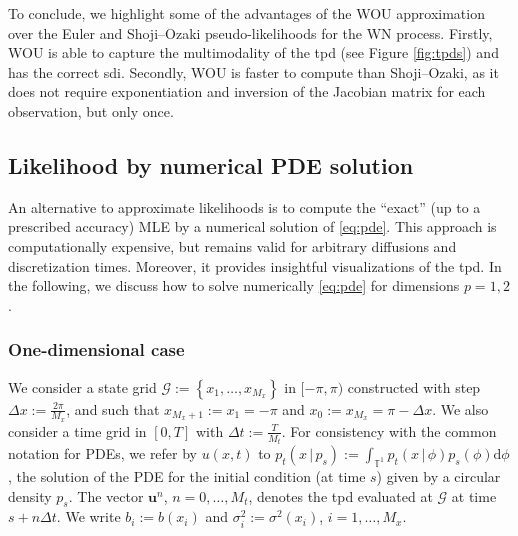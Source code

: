 \documentclass[oneside,11pt]{article}
\newcommand{\T}{\mathbb{T}}
\newcommand{\rd}{\mathrm{d}}
\newcommand{\bu}{\mathbf{u}}
\newcommand{\lrb}[1]{\left\{#1\right\}}
\begin{document}
To conclude, we highlight some of the advantages of the WOU approximation over the Euler and Shoji--Ozaki pseudo-likelihoods for the WN process. Firstly, WOU is able to capture the multimodality of the tpd (see Figure \ref{fig:tpds}) and has the correct sdi. Secondly, WOU is faster to compute than Shoji--Ozaki, as it does not require exponentiation and inversion of the Jacobian matrix for each observation, but only once.

\subsection{Likelihood by numerical PDE solution}
\label{sec:est:pde}

An alternative to approximate likelihoods is to compute the ``exact'' (up to a prescribed accuracy) MLE by a numerical solution of \eqref{eq:pde}. This approach is computationally expensive, but remains valid for arbitrary diffusions and discretization times. Moreover, it provides insightful visualizations of the tpd. In the following, we discuss how to solve numerically \eqref{eq:pde} for dimensions $p=1,2$.

\subsubsection{One-dimensional case}

We consider a state grid $\mathcal{G}:=\lrb{x_1,\ldots,x_{M_x}}$ in $[-\pi,\pi)$ constructed with step $\Delta x:=\frac{2\pi}{M_x}$, and such that $x_{M_x+1}\allowbreak:=x_{1}=-\pi$ and $x_{0}:=x_{M_x}=\pi-\Delta x$. We also consider a time grid in $[0, T]$ with $\Delta t:=\frac{T}{M_t}$. For consistency with the common notation for PDEs, we refer by $u(x,t)$ to $p_t(x\,|\,p_s):=\int_{\T^1}p_t(x\,|\,\phi)p_s(\phi)\rd\phi$, the solution of the PDE for the initial condition (at time $s$) given by a circular density $p_s$. The vector $\bu^n$, $n=0,\ldots,{M_t}$, denotes the tpd evaluated at $\mathcal{G}$ at time $s+n\Delta t$. We write $b_{i}:=b(x_i)$ and $\sigma^2_i:=\sigma^2(x_i)$, $i=1,\ldots,{M_x}$.\\
\end{document}

